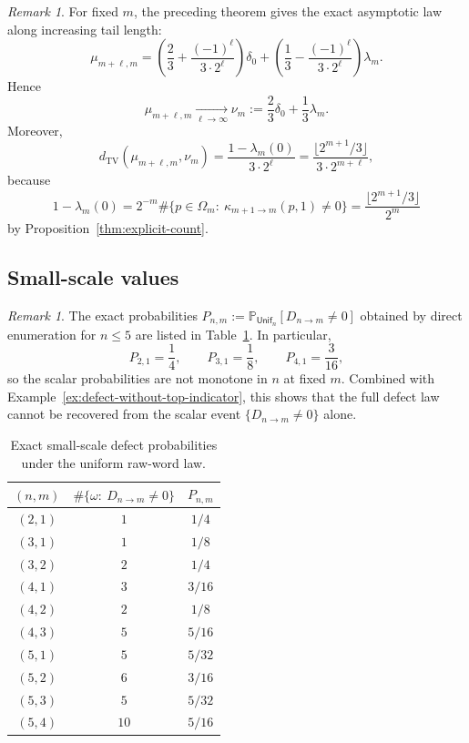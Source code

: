 \documentclass[11pt,reqno]{amsart}
\numberwithin{equation}{section}
\theoremstyle{plain}
\theoremstyle{definition}
\theoremstyle{remark}
\newtheorem{remark}[theorem]{Remark}
\newcommand{\PP}{\mathbb{P}}
\newcommand{\Unif}{\mathsf{Unif}}
\begin{document}
\begin{remark}
\label{rem:limit-law}
For fixed $m$, the preceding theorem gives the exact asymptotic law along
increasing tail length:
\[
\mu_{m+\ell,m}
=
\left(\frac23+\frac{(-1)^\ell}{3\cdot 2^\ell}\right)\delta_0
+
\left(\frac13-\frac{(-1)^\ell}{3\cdot 2^\ell}\right)\lambda_m.
\]
Hence
\[
\mu_{m+\ell,m}\xrightarrow[\ell\to\infty]{}\nu_m
:=
\frac23\delta_0+\frac13\lambda_m.
\]
Moreover,
\[
d_{\mathrm{TV}}(\mu_{m+\ell,m},\nu_m)
=
\frac{1-\lambda_m(0)}{3\cdot 2^\ell}
=
\frac{\lfloor 2^{m+1}/3\rfloor}{3\cdot 2^{m+\ell}},
\]
because
\[
1-\lambda_m(0)
=
2^{-m}\#\{p\in\Omega_m:\ \kappa_{m+1\to m}(p,1)\ne 0\}
=
\frac{\lfloor 2^{m+1}/3\rfloor}{2^m}
\]
by Proposition~\ref{thm:explicit-count}.
\end{remark}

\subsection{Small-scale values}

\begin{remark}
\label{rem:small-values}
The exact probabilities $P_{n,m}:=\PP_{\Unif_n}[D_{n\to m}\ne 0]$ obtained by
direct enumeration for $n\le 5$ are listed in Table~\ref{tab:small-values}.
In particular,
\[
P_{2,1}=\frac14,
\qquad
P_{3,1}=\frac18,
\qquad
P_{4,1}=\frac{3}{16},
\]
so the scalar probabilities are not monotone in $n$ at fixed $m$.  Combined
with Example~\ref{ex:defect-without-top-indicator}, this shows that the full
defect law cannot be recovered from the scalar event $\{D_{n\to m}\ne 0\}$
alone.
\end{remark}

\begin{table}[t]
\centering
\small
\renewcommand{\arraystretch}{1.15}
\begin{tabular}{ccc}
\toprule
$(n,m)$ & $\#\{\omega:\ D_{n\to m}\ne 0\}$ & $P_{n,m}$ \\
\midrule
$(2,1)$ & $1$ & $1/4$ \\
$(3,1)$ & $1$ & $1/8$ \\
$(3,2)$ & $2$ & $1/4$ \\
$(4,1)$ & $3$ & $3/16$ \\
$(4,2)$ & $2$ & $1/8$ \\
$(4,3)$ & $5$ & $5/16$ \\
$(5,1)$ & $5$ & $5/32$ \\
$(5,2)$ & $6$ & $3/16$ \\
$(5,3)$ & $5$ & $5/32$ \\
$(5,4)$ & $10$ & $5/16$ \\
\bottomrule
\end{tabular}
\caption{Exact small-scale defect probabilities under the uniform raw-word law.}
\label{tab:small-values}
\end{table}
\end{document}
